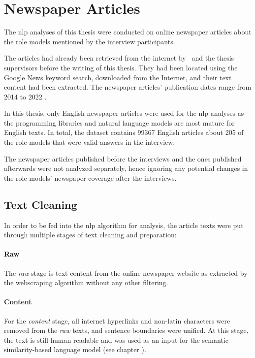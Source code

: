 \section{Newspaper Articles}
The \gls{nlp} analyses of this thesis were conducted on online newspaper articles about the role models mentioned by the interview participants.

The articles had already been retrieved from the internet by~\textcite{fenske_using_2022} and the thesis supervisors before the writing of this thesis. They had been located using the Google News keyword search, downloaded from the Internet, and their text content had been extracted. The newspaper articles' publication dates range from 2014 to 2022 \autocite{fenske_using_2022}.

In this thesis, only English newspaper articles were used for the \gls{nlp} analyses as the programming libraries and natural language models are most mature for English texts. In total, the dataset contains \SI{99367}{} English articles about \SI{205}{} of the role models that were valid answers in the interview.

The newspaper articles published before the interviews and the ones published afterwards were not analyzed separately, hence ignoring any potential changes in the role models' newspaper coverage after the interviews.


\subsection*{Text Cleaning}
In order to be fed into the \gls{nlp} algorithm for analysis, the article texts were put through multiple stages of text cleaning and preparation:

\paragraph{Raw} The \textit{raw} stage is text content from the online newspaper website as extracted by the webscraping algorithm without any other filtering.

\paragraph{Content} For the \textit{content} stage, all internet hyperlinks and non-latin characters were removed from the \textit{raw} texts, and sentence boundaries were unified. At this stage, the text is still human-readable and was used as an input for the semantic similarity-based language model (see chapter ).

